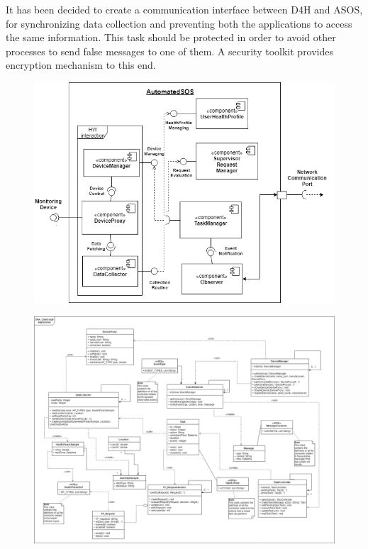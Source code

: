 \begin{flushleft}
It has been decided to create a communication interface between D4H and ASOS, for synchronizing data collection and preventing both the applications to access the same information. This task should be protected in order to avoid other processes to send false messages to one of them. A security toolkit provides encryption mechanism to this end.
\begin{figure}[H]
	\includegraphics[scale=0.6]{images/uml/ASOS_client_component}
	\caption{}
\end{figure}


\begin{figure}[H]
	\centering
	\includegraphics[scale=0.33]{images/uml/D4H_client_class}
	\caption{}
\end{figure}



\end{flushleft}
